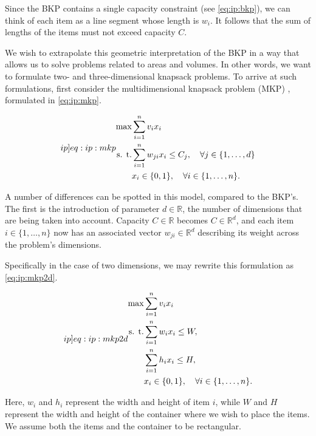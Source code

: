 Since the BKP contains a single capacity constraint (see \cref{eq:ip:bkp}), we can think of each item as a line segment whose length is $w_i$. It follows that the sum of lengths of the items must not exceed capacity $C$.

We wish to extrapolate this geometric interpretation of the BKP in a way that allows us to solve problems related to areas and volumes. In other words, we want to formulate two- and three-dimensional knapsack problems. To arrive at such formulations, first consider the multidimensional knapsack problem (MKP) \cite{LAABADI2018}, formulated in \cref{eq:ip:mkp}.

\begin{align}
    \label[ip]{eq:ip:mkp}
    \begin{split}
        \max & \sum_{i=1}^{n}v_ix_i\\
        \text{s. t.}& \sum_{i=1}^{n}w_{ji}x_i \leq C_j, \quad \forall j \in \{1,\dots,d\}\\
        & x_i \in \{0,1\}, \quad \forall i \in \{1,\dots,n\}.
    \end{split}
\end{align}

A number of differences can be spotted in this model, compared to the BKP's. The first is the introduction of parameter $d \in \mathbb{R}$, the number of dimensions that are being taken into account. Capacity $C \in \mathbb{R}$ becomes $C \in \mathbb{R}^d$, and each item $i \in \{1,\dots,n\}$ now has an associated vector $w_{ji} \in \mathbb{R}^{d}$ describing its weight across the problem's dimensions.

Specifically in the case of two dimensions, we may rewrite this formulation as \cref{eq:ip:mkp2d}.

\begin{align}
    \label[ip]{eq:ip:mkp2d}
    \begin{split}
        \max & \sum_{i=1}^{n}v_ix_i\\
        \text{s. t.}& \sum_{i=1}^{n}w_ix_i \leq W,\\
        & \sum_{i=1}^{n}h_ix_i \leq H,\\
        & x_i \in \{0,1\}, \quad \forall i \in \{1,\dots,n\}.
    \end{split}
\end{align}

Here, $w_i$ and $h_i$ represent the width and height of item $i$, while $W$ and $H$ represent the width and height of the container where we wish to place the items. We assume both the items and the container to be rectangular.

